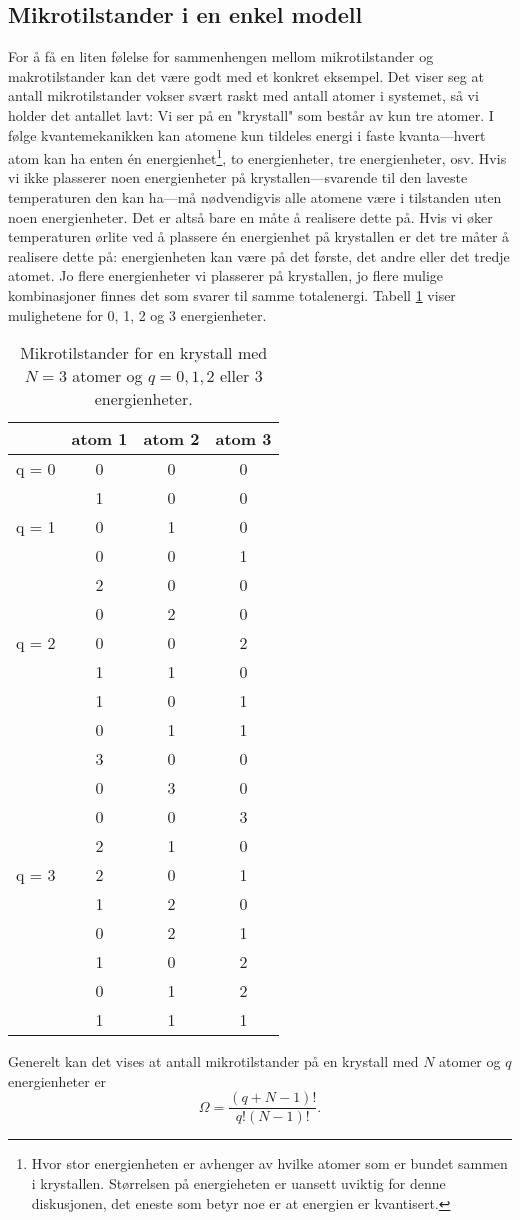 \subsection{Mikrotilstander i en enkel modell}
For å få en liten følelse for sammenhengen mellom mikrotilstander og makrotilstander kan det være godt med et konkret eksempel. Det viser seg at antall mikrotilstander vokser svært raskt med antall atomer i systemet, så vi holder det antallet lavt: Vi ser på en "krystall" som består av kun tre atomer. I følge kvantemekanikken kan atomene kun tildeles energi i faste kvanta---hvert atom kan ha enten \'en energienhet\footnote{Hvor stor energienheten er avhenger av hvilke atomer som er bundet sammen i krystallen. Størrelsen på energieheten er uansett uviktig for denne diskusjonen, det eneste som betyr noe er at energien er kvantisert.}, to energienheter, tre energienheter, osv. Hvis vi ikke plasserer noen energienheter på krystallen---svarende til den laveste temperaturen den kan ha---må nødvendigvis alle atomene være i tilstanden uten noen energienheter. Det er altså bare en måte å realisere dette på. Hvis vi øker temperaturen ørlite ved å plassere \'en energienhet på krystallen er det tre måter å realisere dette på: energienheten kan være på det første, det andre eller det tredje atomet. Jo flere energienheter vi plasserer på krystallen, jo flere mulige kombinasjoner finnes det som svarer til samme totalenergi. Tabell \ref{tab:t2:multipl} viser mulighetene for 0, 1, 2 og 3 energienheter.

\begin{table}[htp]
\begin{center}
\begin{tabular}{c|ccc}
& atom 1 & atom 2 & atom 3 \\
\hline
\hline
q = 0 & 0 & 0 & 0 \\
\hline
& 1 & 0 & 0 \\
q = 1 & 0 & 1 & 0 \\
& 0 & 0 & 1 \\
\hline
& 2 & 0 & 0 \\
& 0 & 2 & 0 \\
q = 2 & 0 & 0 & 2 \\
& 1 & 1 & 0 \\
& 1 & 0 & 1 \\
& 0 & 1 & 1  \\
\hline
& 3 & 0 & 0 \\
& 0 & 3 & 0 \\
& 0 & 0 & 3 \\
& 2 & 1 & 0 \\
q = 3 & 2 & 0 & 1 \\
& 1 & 2 & 0 \\
& 0 & 2 & 1  \\
& 1 & 0 & 2 \\
& 0 & 1 & 2 \\
& 1 & 1 & 1 \\
\hline
\hline
\end{tabular}
\end{center}
\caption{Mikrotilstander for en krystall med $N=3$ atomer og $q = 0, 1, 2$ eller 3 energienheter.}
\label{tab:t2:multipl}
\end{table}

Generelt kan det vises at antall mikrotilstander på en krystall med $N$ atomer og $q$ energienheter er 
\begin{displaymath}
	\Omega = \frac{(q+N-1)!}{q!(N-1)!}.
\end{displaymath}